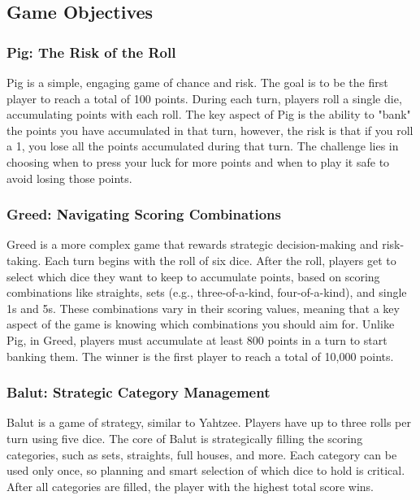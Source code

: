 \subsection{Game Objectives}

\subsubsection{Pig: The Risk of the Roll}

Pig is a simple, engaging game of chance and risk. The goal is to be the first player to reach a total of 100 points. During each turn, players roll a single die, accumulating points with each roll. The key aspect of Pig is the ability to "bank" the points you have accumulated in that turn, however, the risk is that if you roll a 1, you lose all the points accumulated during that turn. The challenge lies in choosing when to press your luck for more points and when to play it safe to avoid losing those points.

\subsubsection{Greed: Navigating Scoring Combinations}

Greed is a more complex game that rewards strategic decision-making and risk-taking. Each turn begins with the roll of six dice. After the roll, players get to select which dice they want to keep to accumulate points, based on scoring combinations like straights, sets (e.g., three-of-a-kind, four-of-a-kind), and single 1s and 5s. These combinations vary in their scoring values, meaning that a key aspect of the game is knowing which combinations you should aim for. Unlike Pig, in Greed, players must accumulate at least 800 points in a turn to start banking them. The winner is the first player to reach a total of 10,000 points.

\subsubsection{Balut: Strategic Category Management}

Balut is a game of strategy, similar to Yahtzee. Players have up to three rolls per turn using five dice. The core of Balut is strategically filling the scoring categories, such as sets, straights, full houses, and more. Each category can be used only once, so planning and smart selection of which dice to hold is critical. After all categories are filled, the player with the highest total score wins.

